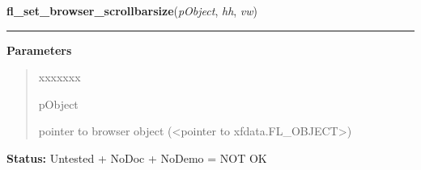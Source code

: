     \label{xformslib:library:fl_set_browser_scrollbarsize}

    \vspace{0.5ex}

\hspace{.8\funcindent}\begin{boxedminipage}{\funcwidth}

    \raggedright \textbf{fl\_set\_browser\_scrollbarsize}(\textit{pObject}, \textit{hh}, \textit{vw})

    \vspace{-1.5ex}

    \rule{\textwidth}{0.5\fboxrule}
\setlength{\parskip}{2ex}
\setlength{\parskip}{1ex}
      \textbf{Parameters}
      \vspace{-1ex}

      \begin{quote}
        \begin{Ventry}{xxxxxxx}

          \item[pObject]

          pointer to browser object ({\textless}pointer to 
          xfdata.FL\_OBJECT{\textgreater})

        \end{Ventry}

      \end{quote}

\textbf{Status:} Untested + NoDoc + NoDemo = NOT OK



    \end{boxedminipage}

    \label{xformslib:library:fl_show_browser_line}

    \vspace{0.5ex}

